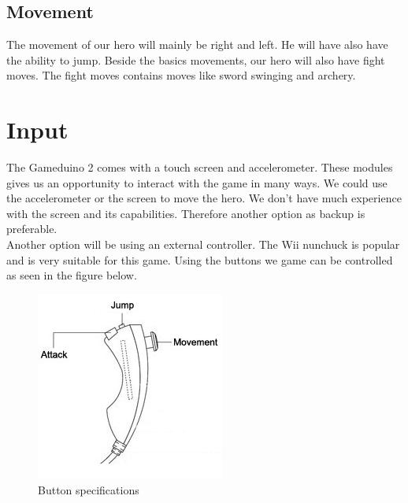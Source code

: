 \subsection{Movement} The movement of our hero will mainly be right and left.
He will have also have the ability to jump. Beside the basics movements, our
hero will also have fight moves. The fight moves contains moves like sword
swinging and archery.

\section{Input} The Gameduino 2 comes with a touch screen and accelerometer.
These modules gives us an opportunity to interact with the game in many ways.
We could use the accelerometer or the screen to move the hero. We don’t have
much experience with the screen and its capabilities. Therefore another option
as backup is preferable.\\ Another option will be using an external controller.
The Wii nunchuck is popular and is very suitable for this game.  Using the
buttons we game can be controlled as seen in the figure below.

\begin{figure}[h] 
  \centering 
  \includegraphics[scale=0.6]{Figures/nunchuk}
  \caption{Button specifications} 
  \label{fig:Nunchuk} 
\end{figure}
